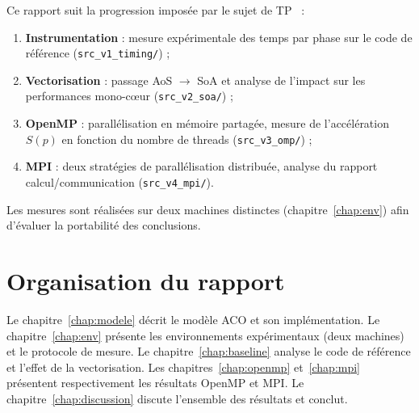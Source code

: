 Ce rapport suit la progression imposée par le sujet de TP~\cite{ensta2026os202} :

\begin{enumerate}
    \item \textbf{Instrumentation} : mesure expérimentale des temps par phase sur le
          code de référence (\texttt{src\_v1\_timing/}) ;
    \item \textbf{Vectorisation} : passage AoS $\rightarrow$ SoA et analyse de l'impact
          sur les performances mono-c\oe{}ur (\texttt{src\_v2\_soa/}) ;
    \item \textbf{OpenMP} : parallélisation en mémoire partagée, mesure de l'accélération
          $S(p)$ en fonction du nombre de threads (\texttt{src\_v3\_omp/}) ;
    \item \textbf{MPI} : deux stratégies de parallélisation distribuée, analyse du
          rapport calcul/communication (\texttt{src\_v4\_mpi/}).
\end{enumerate}

Les mesures sont réalisées sur deux machines distinctes (chapitre~\ref{chap:env})
afin d'évaluer la portabilité des conclusions.

\section{Organisation du rapport}

Le chapitre~\ref{chap:modele} décrit le modèle ACO et son implémentation.
Le chapitre~\ref{chap:env} présente les environnements expérimentaux (deux machines)
et le protocole de mesure. Le chapitre~\ref{chap:baseline} analyse le code de
référence et l'effet de la vectorisation. Les chapitres~\ref{chap:openmp}
et~\ref{chap:mpi} présentent respectivement les résultats OpenMP et MPI.
Le chapitre~\ref{chap:discussion} discute l'ensemble des résultats et conclut.
